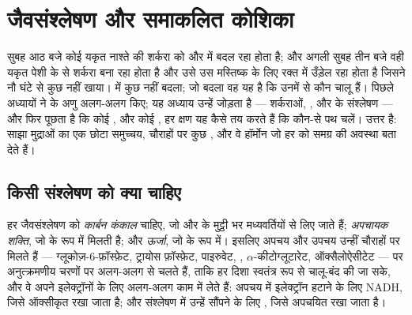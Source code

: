 \chapter{जैवसंश्लेषण और समाकलित कोशिका}\label{ch:b1:biosyntheses-integration}

सुबह आठ बजे कोई यकृत नाश्ते की शर्करा को  और  में बदल रहा
होता है; और अगली सुबह तीन बजे वही यकृत पेशी के  से शर्करा बना
रहा होता है और उसे उस मस्तिष्क के लिए रक्त में उँड़ेल रहा होता है जिसने
नौ घंटे से कुछ नहीं खाया।  में कुछ नहीं बदला; जो बदला वह यह है कि
उनमें से कौन चालू हैं। पिछले अध्यायों ने  के अणु अलग-अलग किए; यह
अध्याय उन्हें जोड़ता है --- शर्कराओं, ,  और  के
संश्लेषण --- और फिर पूछता है कि कोई , और कोई , हर क्षण यह कैसे
तय करते हैं कि कौन-से पथ चलें। उत्तर है: साझा मुद्राओं का एक छोटा
समुच्चय, चौराहों पर कुछ , और वे हॉर्मोन जो हर  को समग्र की
अवस्था बता देते हैं।

\section{किसी संश्लेषण को क्या चाहिए}

\begin{proposition}\label{prop:b1:biosyntheses-integration:needs}
हर जैवसंश्लेषण को \emph{कार्बन कंकाल} चाहिए, जो  और  के मुट्ठी भर मध्यवर्तियों से लिए जाते हैं; \emph{अपचायक
शक्ति}, जो  के रूप में मिलती है; और \emph{ऊर्जा}, जो  के रूप में।
इसलिए अपचय और उपचय उन्हीं चौराहों पर मिलते हैं ---
ग्लूकोज़-6-फ़ॉस्फ़ेट, ट्रायोस फ़ॉस्फ़ेट, पाइरुवेट, ,
$\alpha$-कीटोग्लूटारेट, ऑक्सैलोऐसीटेट --- पर अनुत्क्रमणीय चरणों पर
अलग-अलग  से चलते हैं, ताकि हर दिशा स्वतंत्र रूप से चालू-बंद की जा
सके, और वे अपने इलेक्ट्रॉनों के लिए अलग-अलग  काम में लेते हैं:
अपचय में इलेक्ट्रॉन हटाने के लिए NADH, जिसे ऑक्सीकृत रखा जाता है; और
संश्लेषण में उन्हें सौंपने के लिए , जिसे अपचयित रखा जाता है।
\end{proposition}

